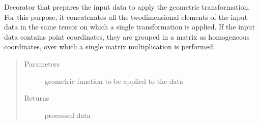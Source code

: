 \documentclass[letterpaper,10pt,english]{sphinxmanual}
\begin{document}

\begin{fulllineitems}
\label{\detokenize{ida_lib.operations:ida_lib.operations.geometry_ops_functional.prepare_data}}
Decorator that prepares the input data to apply the geometric transformation. For this purpose, it concatenates all
the two\sphinxhyphen{}dimensional elements of the input data in the same tensor on which a single transformation is applied.  If
the input data contains point coordinates, they are grouped in a matrix as homogeneous coordinates, over which a
single matrix multiplication is performed.
\begin{quote}\begin{description}
\item[{Parameters}] \leavevmode
{} \textendash{} geometric function to be applied to the data

\item[{Returns}] \leavevmode
processed data

\end{description}\end{quote}

\end{fulllineitems}

\end{document}
